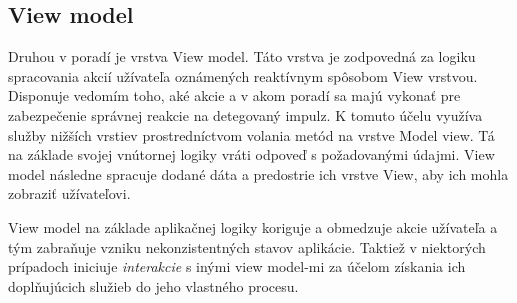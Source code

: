 \subsection{View model}\label{ViewModel}

Druhou v poradí je vrstva View model. Táto vrstva je zodpovedná za logiku spracovania akcií užívateľa oznámených reaktívnym spôsobom View vrstvou. Disponuje vedomím toho, aké akcie a v akom poradí sa majú vykonať pre zabezpečenie správnej reakcie na detegovaný impulz. K tomuto účelu využíva služby nižších vrstiev prostredníctvom volania metód na vrstve Model view. Tá na základe svojej vnútornej logiky vráti odpoveď s požadovanými údajmi. View model následne spracuje dodané dáta a predostrie ich vrstve View, aby ich mohla zobraziť užívateľovi.

View model na základe aplikačnej logiky koriguje a obmedzuje akcie užívateľa a tým zabraňuje vzniku nekonzistentných stavov aplikácie. Taktiež v niektorých prípadoch iniciuje \textit{interakcie} s inými view model-mi za účelom získania ich doplňujúcich služieb do jeho vlastného procesu.


